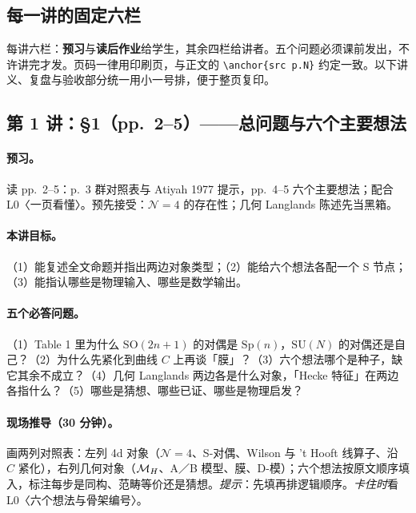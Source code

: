 \subsection{每一讲的固定六栏}

每讲六栏：\textbf{预习}与\textbf{读后作业}给学生，其余四栏给讲者。五个问题必须课前发出，不许讲完才发。页码一律用印刷页，与正文的 \verb|\anchor{src p.N}| 约定一致。以下讲义、复盘与验收部分统一用小一号排，便于整页复印。\pC

{\small\linespread{0.95}\selectfont
\subsection{第 1 讲：\S1（pp.~2--5）——总问题与六个主要想法}

\paragraph{预习。}读 pp.~2--5：p.~3 群对照表与 Atiyah 1977 提示，pp.~4--5 六个主要想法；配合 L0〈一页看懂〉。预先接受：\(\mathcal N=4\) 的存在性；几何 Langlands 陈述先当黑箱。\pC

\paragraph{本讲目标。}（1）能复述全文命题并指出两边对象类型；（2）能给六个想法各配一个 S 节点；（3）能指认哪些是物理输入、哪些是数学输出。\pC

\paragraph{五个必答问题。}（1）Table 1 里为什么 \(\mathrm{SO}(2n+1)\) 的对偶是 \(\mathrm{Sp}(n)\)，\(\mathrm{SU}(N)\) 的对偶还是自己？（2）为什么先紧化到曲线 \(C\) 上再谈「膜」？（3）六个想法哪个是种子，缺它其余不成立？（4）几何 Langlands 两边各是什么对象，「Hecke 特征」在两边各指什么？（5）哪些是猜想、哪些已证、哪些是物理启发？\pC

\paragraph{现场推导（30 分钟）。}画两列对照表：左列 4d 对象（\(\mathcal N=4\)、S-对偶、Wilson 与 't Hooft 线算子、沿 \(C\) 紧化），右列几何对象（\(\mathcal{M}_H\)、A／B 模型、膜、D-模）；六个想法按原文顺序填入，标注每步是同构、范畴等价还是猜想。\emph{提示}：先填再排逻辑顺序。\emph{卡住时}看 L0〈六个想法与骨架编号〉。\pC

}
